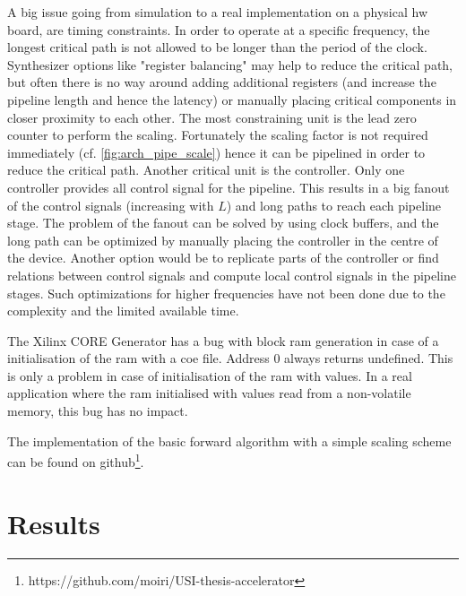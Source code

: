 \documentclass[mscthesis]{usiinfthesis}
\begin{document}
A big issue going from simulation to a real implementation on a physical
\gls{hw} board, are timing constraints. In order to operate at a specific
frequency, the longest critical path is not allowed to be longer than the
period of the clock. Synthesizer options like "register balancing" may help to
reduce the critical path, but often there is no way around adding additional
registers (and increase the pipeline length and hence the latency) or manually
placing critical components in closer proximity to each other. The most
constraining unit is the lead zero counter to perform the scaling. Fortunately
the scaling factor is not required immediately (cf. \ref{fig:arch_pipe_scale})
hence it can be pipelined in order to reduce the critical path. Another critical
unit is the controller. Only one controller provides all control signal for the
pipeline. This results in a big fanout of the control signals (increasing with
$L$) and long paths to reach each pipeline stage. The problem of the fanout can
be solved by using clock buffers, and the long path can be optimized by manually
placing the controller in the centre of the device. Another option would be to
replicate parts of the controller or find relations between control signals and
compute local control signals in the pipeline stages.  Such optimizations for
higher frequencies have not been done due to the complexity and the limited
available time.

The Xilinx CORE Generator has a bug with block \gls{ram} generation in case
of a initialisation of the \gls{ram} with a coe file. Address 0 always returns
undefined. This is only a problem in case of initialisation of the \gls{ram}
with values. In a real application where the \gls{ram} initialised with values
read from a non-volatile memory, this bug has no impact.

The implementation of the basic forward algorithm with a simple scaling scheme
can be found on
github\footnote{https://github.com/moiri/USI-thesis-accelerator}.

\chapter{Results}
\label{ch:results}
\glsresetall %
\end{document}
